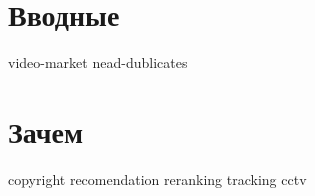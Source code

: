
\section{Вводные}

    {video-market}
    {nead-dublicates}

\section{Зачем}

    {copyright}
    {recomendation}
    {reranking}
    {tracking}
    {cctv}

